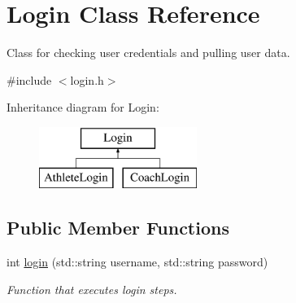 \hypertarget{classLogin}{}\section{Login Class Reference}
\label{classLogin}


Class for checking user credentials and pulling user data.  




{\ttfamily \#include $<$login.\+h$>$}

Inheritance diagram for Login\+:\begin{figure}[H]
\begin{center}
\leavevmode
\includegraphics[height=2.000000cm]{classLogin}
\end{center}
\end{figure}
\subsection*{Public Member Functions}
\begin{DoxyCompactItemize}
\item 
int \mbox{\hyperlink{classLogin_a6c995557205cfdf5772555d007a7ab2a}{login}} (std\+::string username, std\+::string password)
\begin{DoxyCompactList}\small\item\em Function that executes login steps. \end{DoxyCompactList}\end{DoxyCompactItemize}
